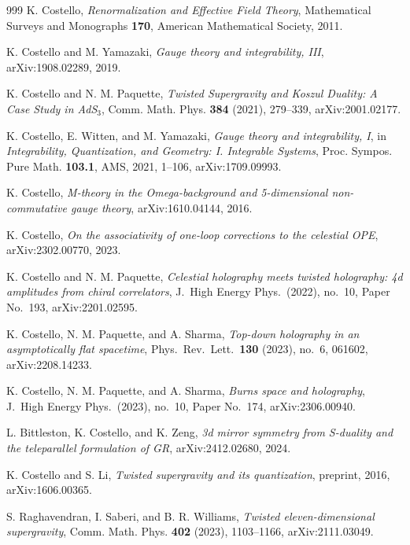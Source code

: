 \begin{thebibliography}{999}
K. Costello, \emph{Renormalization and Effective Field Theory}, Mathematical Surveys and Monographs \textbf{170}, American Mathematical Society, 2011.

K. Costello and M. Yamazaki, \emph{Gauge theory and integrability, III}, arXiv:1908.02289, 2019.

K. Costello and N. M. Paquette, \emph{Twisted Supergravity and Koszul Duality: A Case Study in AdS$_3$}, Comm. Math. Phys. \textbf{384} (2021), 279--339, arXiv:2001.02177.

K. Costello, E. Witten, and M. Yamazaki, \emph{Gauge theory and integrability, I}, in \emph{Integrability, Quantization, and Geometry: I. Integrable Systems}, Proc. Sympos. Pure Math. \textbf{103.1}, AMS, 2021, 1--106, arXiv:1709.09993.

K. Costello, \emph{M-theory in the Omega-background and 5-dimensional non-commutative gauge theory}, arXiv:1610.04144, 2016.

K. Costello, \emph{On the associativity of one-loop corrections to the celestial OPE}, arXiv:2302.00770, 2023.

K. Costello and N. M. Paquette, \emph{Celestial holography meets twisted holography: 4d amplitudes from chiral correlators}, J.\ High Energy Phys.\ (2022), no.~10, Paper No.~193, arXiv:2201.02595.

K. Costello, N. M. Paquette, and A. Sharma, \emph{Top-down holography in an asymptotically flat spacetime}, Phys.\ Rev.\ Lett.\ \textbf{130} (2023), no.~6, 061602, arXiv:2208.14233.

K. Costello, N. M. Paquette, and A. Sharma, \emph{Burns space and holography}, J.\ High Energy Phys.\ (2023), no.~10, Paper No.~174, arXiv:2306.00940.

L. Bittleston, K. Costello, and K. Zeng, \emph{3d mirror symmetry from S-duality and the teleparallel formulation of GR}, arXiv:2412.02680, 2024.

K. Costello and S. Li, \emph{Twisted supergravity and its quantization}, preprint, 2016, arXiv:1606.00365.

S. Raghavendran, I. Saberi, and B. R. Williams, \emph{Twisted eleven-dimensional supergravity}, Comm. Math. Phys. \textbf{402} (2023), 1103--1166, arXiv:2111.03049.


\end{thebibliography}
